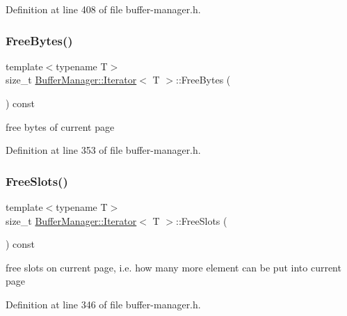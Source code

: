 Definition at line 408 of file buffer-\/manager.\+h.

\mbox{\label{class_buffer_manager_1_1_iterator_a3a53f35f35074aa2079dead6cc606a5b}} 
\subsubsection{\texorpdfstring{FreeBytes()}{FreeBytes()}}
{\footnotesize\ttfamily template$<$typename T$>$ \\
size\+\_\+t \mbox{\hyperlink{class_buffer_manager_1_1_iterator}{Buffer\+Manager\+::\+Iterator}}$<$ T $>$\+::Free\+Bytes (\begin{DoxyParamCaption}{ }\end{DoxyParamCaption}) const\hspace{0.3cm}{\ttfamily [inline]}}

free bytes of current page 

Definition at line 353 of file buffer-\/manager.\+h.

\mbox{\label{class_buffer_manager_1_1_iterator_a436c0bafa40d441a59c0fb0e3aeb62cc}} 
\subsubsection{\texorpdfstring{FreeSlots()}{FreeSlots()}}
{\footnotesize\ttfamily template$<$typename T$>$ \\
size\+\_\+t \mbox{\hyperlink{class_buffer_manager_1_1_iterator}{Buffer\+Manager\+::\+Iterator}}$<$ T $>$\+::Free\+Slots (\begin{DoxyParamCaption}{ }\end{DoxyParamCaption}) const\hspace{0.3cm}{\ttfamily [inline]}}

free slots on current page, i.\+e. how many more element can be put into current page 

Definition at line 346 of file buffer-\/manager.\+h.

\mbox{\label{class_buffer_manager_1_1_iterator_a7a42be8229dace561a4e71f80ab406f2}} 
